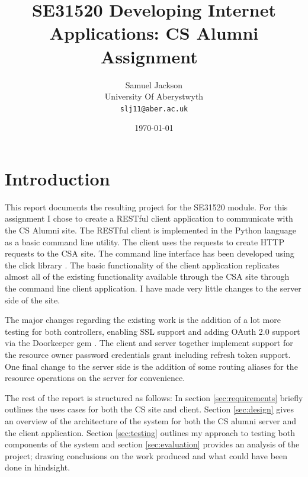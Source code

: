 \documentclass[paper=a4, fontsize=11pt]{scrartcl}	%
\title{
	\vspace{-0.5in} 	\usefont{OT1}{bch}{b}{n}
	 SE31520 Developing Internet Applications: CS Alumni Assignment\
}
\author{
	\usefont{OT1}{bch}{m}{n} Samuel Jackson
	\\ \usefont{OT1}{bch}{m}{n} University Of Aberystwyth
	\\   \texttt{slj11@aber.ac.uk}
}
\date{\today}
\numberwithin{equation}{section}															%
\numberwithin{figure}{section}																%
\numberwithin{table}{section}
\begin{document}
\maketitle
\clearpage

\section{Introduction}
This report documents the resulting project for the SE31520 module. For this assignment I chose to create a RESTful client application to communicate with the CS Alumni site. The RESTful client is implemented in the Python language as a basic command line utility. The client uses the requests \cite{libraryRequests} to create HTTP requests to the CSA site. The command line interface has been developed using the click library \cite{libraryClick}. The basic functionality of the client application replicates almost all of the existing functionality available through the CSA site through the command line client application. I have made very little changes to the server side of the site. 

The major changes regarding the existing work is the addition of a lot more testing for both controllers, enabling SSL support and adding OAuth 2.0 \cite{rfc6749} support via the Doorkeeper gem \cite{libraryDoorkeeper}. The client and server together implement support for the resource owner password credentials grant \cite{rfc6749resourceOwner} including refresh token support. One final change to the server side is the addition of some routing aliases for the resource operations on the server for convenience.

The rest of the report is structured as follows: In section \ref{sec:requirements} briefly outlines the uses cases for both the CS site and client. Section \ref{sec:design} gives an overview of the architecture of the system for both the CS alumni server and the client application. Section \ref{sec:testing} outlines my approach to testing both components of the system and section \ref{sec:evaluation} provides an analysis of the project; drawing conclusions on the work produced and what could have been done in hindsight.
\end{document}
